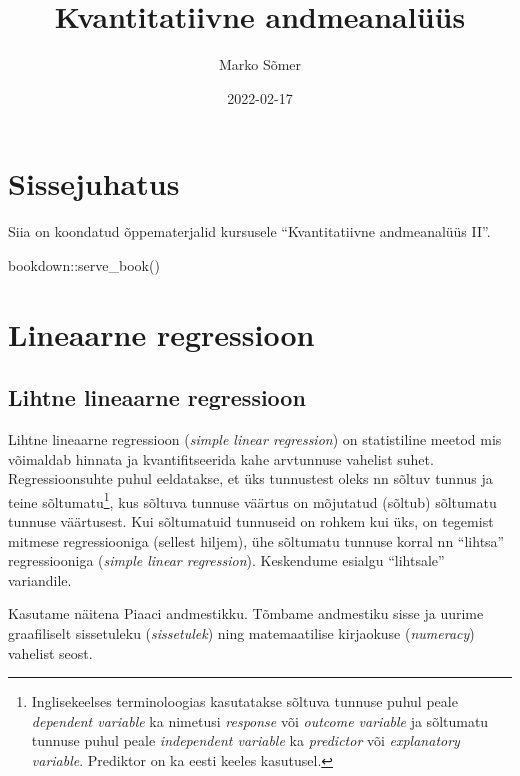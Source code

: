 \documentclass[
]{book}
\title{Kvantitatiivne andmeanalüüs}
\author{Marko Sõmer}
\date{2022-02-17}
\newenvironment{Shaded}{\begin{snugshade}}{\end{snugshade}}
\newcommand{\FunctionTok}[1]{\textcolor[rgb]{0.00,0.00,0.00}{#1}}
\newcommand{\NormalTok}[1]{#1}
\newcommand{\SpecialCharTok}[1]{\textcolor[rgb]{0.00,0.00,0.00}{#1}}
\begin{document}
\maketitle

{
\setcounter{tocdepth}{1}
\tableofcontents
}
\hypertarget{sissejuhatus}{%
\chapter{Sissejuhatus}\label{sissejuhatus}}

Siia on koondatud õppematerjalid kursusele ``Kvantitatiivne andmeanalüüs II''.

\begin{Shaded}
\begin{Highlighting}[]
\NormalTok{bookdown}\SpecialCharTok{::}\FunctionTok{serve\_book}\NormalTok{()}
\end{Highlighting}
\end{Shaded}

\hypertarget{lineaarne-regressioon}{%
\chapter{Lineaarne regressioon}\label{lineaarne-regressioon}}

\hypertarget{lihtne-lineaarne-regressioon}{%
\section{Lihtne lineaarne regressioon}\label{lihtne-lineaarne-regressioon}}

Lihtne lineaarne regressioon (\emph{simple linear regression}) on statistiline meetod mis võimaldab hinnata ja kvantifitseerida kahe arvtunnuse vahelist suhet. Regressioonsuhte puhul eeldatakse, et üks tunnustest oleks nn sõltuv tunnus ja teine sõltumatu\footnote{Inglisekeelses terminoloogias kasutatakse sõltuva tunnuse puhul peale \emph{dependent variable} ka nimetusi \emph{response} või \emph{outcome variable} ja sõltumatu tunnuse puhul peale \emph{independent variable} ka \emph{predictor} või \emph{explanatory variable}. Prediktor on ka eesti keeles kasutusel.}, kus sõltuva tunnuse väärtus on mõjutatud (sõltub) sõltumatu tunnuse väärtusest. Kui sõltumatuid tunnuseid on rohkem kui üks, on tegemist mitmese regressiooniga (sellest hiljem), ühe sõltumatu tunnuse korral nn ``lihtsa'' regressiooniga (\emph{simple linear regression}). Keskendume esialgu ``lihtsale'' variandile.

Kasutame näitena Piaaci andmestikku. Tõmbame andmestiku sisse ja uurime graafiliselt sissetuleku (\emph{sissetulek}) ning matemaatilise kirjaokuse (\emph{numeracy}) vahelist seost.
\end{document}
